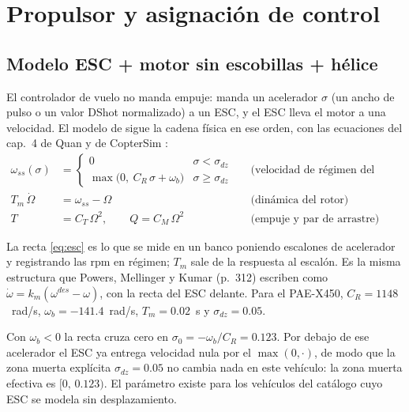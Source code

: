 \section{Propulsor y asignación de control}
\label{sec:propulsion}

\subsection{Modelo ESC + motor sin escobillas + hélice}

El controlador de vuelo no manda empuje: manda un acelerador $\sigma$
(un ancho de pulso o un valor DShot normalizado) a un ESC, y el ESC lleva el
motor a una velocidad. El modelo de  sigue la cadena
física en ese orden, con las ecuaciones del cap.~4 de Quan \cite{qq17} y de
CopterSim \cite{cs19}:
\begin{align}
\omega_{ss}(\sigma) &= \begin{cases}
0 & \sigma < \sigma_{dz}\\
\max\!\big(0,\ C_R\,\sigma + \omega_b\big) & \sigma\ge\sigma_{dz}
\end{cases}
&&\text{(velocidad de régimen del ESC)}\label{eq:esc}\\
T_m\,\dot\Omega &= \omega_{ss} - \Omega &&\text{(dinámica del rotor)}\label{eq:motor}\\
T &= C_T\,\Omega^2,\qquad Q = C_M\,\Omega^2 &&\text{(empuje y par de arrastre)}\label{eq:TQ}
\end{align}

La recta \eqref{eq:esc} es lo que se mide en un banco poniendo escalones de
acelerador y registrando las rpm en régimen; $T_m$ sale de la respuesta al
escalón. Es la misma estructura que Powers, Mellinger y Kumar \cite{hb16}
(p.~312) escriben como $\dot\omega = k_m(\omega^{des}-\omega)$, con la recta
del ESC delante. Para el PAE-X450, $C_R=1148$~rad/s, $\omega_b=-141.4$~rad/s,
$T_m=0.02$~s y $\sigma_{dz}=0.05$.

\begin{nota}
Con $\omega_b<0$ la recta cruza cero en $\sigma_0=-\omega_b/C_R=0.123$. Por
debajo de ese acelerador el ESC ya entrega velocidad nula por el
$\max(0,\cdot)$, de modo que la zona muerta explícita $\sigma_{dz}=0.05$ no
cambia nada en este vehículo: la zona muerta efectiva es $[0,\,0.123)$. El
parámetro existe para los vehículos del catálogo cuyo ESC se modela sin
desplazamiento.
\end{nota}

